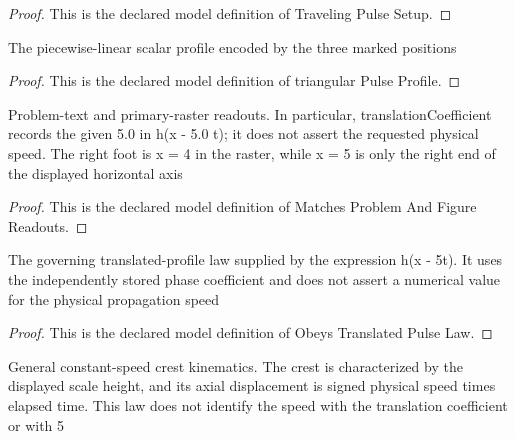 \begin{proof}
  This is the declared model definition of Traveling Pulse Setup.
\end{proof}
\begin{definition}
  \label{def:physics:phyx-mini-0301:phyxminiproblems-problemphyxmini0301-triangularpulseprofile}
  The piecewise-linear scalar profile encoded by the three marked positions
\end{definition}
\begin{proof}
  This is the declared model definition of triangular Pulse Profile.
\end{proof}
\begin{definition}
  \label{def:physics:phyx-mini-0301:phyxminiproblems-problemphyxmini0301-matchesproblemandfigurereadouts}
  Problem-text and primary-raster readouts. In particular, translationCoefficient records the given 5.0 in h(x - 5.0 t); it does not assert the requested physical speed. The right foot is x = 4 in the raster, while x = 5 is only the right end of the displayed horizontal axis
\end{definition}
\begin{proof}
  This is the declared model definition of Matches Problem And Figure Readouts.
\end{proof}
\begin{definition}
  \label{def:physics:phyx-mini-0301:phyxminiproblems-problemphyxmini0301-obeystranslatedpulselaw}
  The governing translated-profile law supplied by the expression h(x - 5t). It uses the independently stored phase coefficient and does not assert a numerical value for the physical propagation speed
\end{definition}
\begin{proof}
  This is the declared model definition of Obeys Translated Pulse Law.
\end{proof}
\begin{definition}
  \label{def:physics:phyx-mini-0301:phyxminiproblems-problemphyxmini0301-hasconstantspeedcrestkinematics}
  General constant-speed crest kinematics. The crest is characterized by the displayed scale height, and its axial displacement is signed physical speed times elapsed time. This law does not identify the speed with the translation coefficient or with 5
\end{definition}
